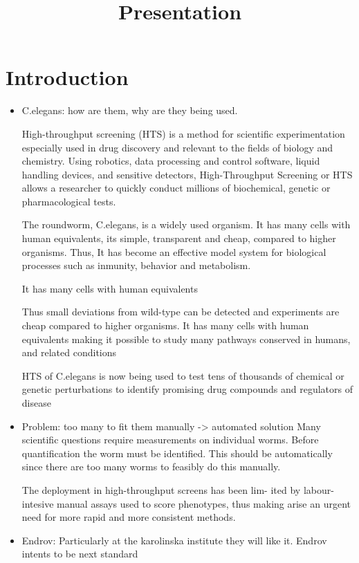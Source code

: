 \documentclass[12pt,letterpaper,oneside]{book}
\title{Presentation}
\begin{document}
\section*{Introduction}

\begin{itemize}
\item C.elegans: how are them, why are they being used.

High-throughput screening (HTS) is a method for scientific experimentation especially
 used in drug discovery and relevant to the fields of biology and chemistry. Using robotics,
 data processing and control software, liquid handling devices, and sensitive detectors, 
High-Throughput
 Screening or HTS allows a researcher to quickly conduct millions of biochemical, genetic or
 pharmacological tests. 

The roundworm, C.elegans, is a widely used organism. It has many cells with
human equivalents, its simple, transparent and cheap, compared to higher organisms.
Thus, It has become
an effective model system for biological processes such as 
inmunity, behavior and metabolism.

It has many cells with human equivalents

Thus small
deviations from wild-type can be detected and experiments are cheap compared to higher
organisms. It has many cells with human equivalents making it possible to study
many pathways conserved in humans, and related conditions


HTS of C.elegans is now being used to test tens of thousands of chemical or genetic
perturbations to identify promising drug compounds and regulators
of disease

\item Problem: too many to fit them manually -> automated solution
Many scientific questions
require measurements on individual worms. Before quantification the
worm must be identified. This should be automatically since there are too many
worms to feasibly do this manually.

The deployment in high-throughput screens has been lim-
ited by labour-intesive manual assays used to score phenotypes, thus making arise an urgent
need for more rapid and more consistent methods.


\item Endrov: Particularly at the karolinska institute they will
  like it. Endrov intents to be next standard
\end{itemize}


\end{document}

